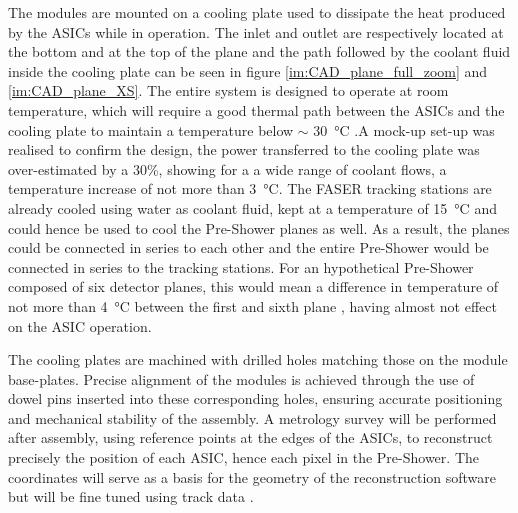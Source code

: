 				The modules are mounted on a cooling plate used to dissipate the heat produced by the ASICs while in operation. The inlet and outlet are respectively located at the bottom and at the top of the plane and the path followed by the coolant fluid inside the cooling plate can be seen in figure \ref{im:CAD_plane_full_zoom} and \ref{im:CAD_plane_XS}. The entire system is designed to operate at room temperature, which will require a good thermal path between the ASICs and the cooling plate to maintain a temperature below $\sim$ \SI{30}{\celsius} \cite{PreShower_TP}.A mock-up set-up was realised to confirm the design, the power transferred to the cooling plate was over-estimated by a 30\%, showing for a a wide range of coolant flows, a temperature increase of not more than \SI{3}{\celsius}. The FASER tracking stations are already cooled using water as coolant fluid, kept at a temperature of \SI{15}{\celsius} and could hence be used to cool the Pre-Shower planes as well. As a result, the planes could be connected in series to each other and the entire Pre-Shower would be connected in series to the tracking stations. For an hypothetical Pre-Shower composed of six detector planes, this would mean a difference in temperature of not more than \SI{4}{\celsius} between the first and sixth plane \cite{PreShower_TP}, having almost not effect on the ASIC operation.
				
				The cooling plates are machined with drilled holes matching those on the module base-plates. Precise alignment of the modules is achieved through the use of dowel pins inserted into these corresponding holes, ensuring accurate positioning and mechanical stability of the assembly. A metrology survey will be performed after assembly, using reference points at the edges of the ASICs, to reconstruct precisely the position of each ASIC, hence each pixel in the Pre-Shower. The coordinates will serve as a basis for the geometry of the reconstruction software but will be fine tuned using track data \cite{PreShower_TP}.
				
